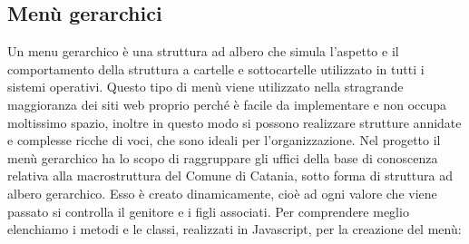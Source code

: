 \documentclass[a4paper,11pt]{article}
\begin{document}
\subsection{Menù gerarchici}
\label{sec:5.1}
Un menu gerarchico è una struttura ad albero che simula l'aspetto e il comportamento della struttura a cartelle e sottocartelle utilizzato in tutti i sistemi operativi. Questo tipo di menù viene utilizzato nella stragrande maggioranza dei siti web proprio perché è facile da implementare e non occupa moltissimo spazio, inoltre in questo modo si possono realizzare strutture annidate e complesse ricche di voci, che sono ideali per l'organizzazione.\newline 
Nel progetto il menù gerarchico ha lo scopo di raggruppare gli uffici della base di conoscenza relativa alla macrostruttura del Comune di Catania, sotto forma di struttura ad albero gerarchico. Esso è creato dinamicamente, cioè ad ogni valore che viene passato si controlla il genitore e i figli associati.
Per comprendere meglio elenchiamo i metodi e le classi, realizzati in Javascript, per la creazione del menù:
\end{document}
